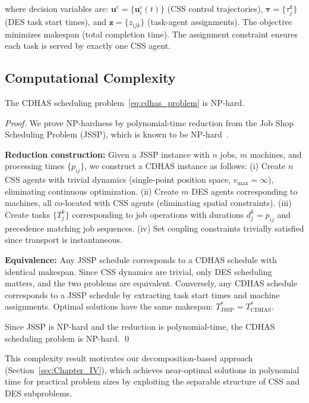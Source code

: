 \documentclass[manuscript,screen,review]{acmart}
\begin{document}
where decision variables are: $\mathbf{u}^c = \{\mathbf{u}_i^c(t)\}$ (CSS control 
trajectories), $\boldsymbol{\tau} = \{\tau_j^k\}$ (DES task start times), and 
$\mathbf{z} = \{z_{ijk}\}$ (task-agent assignments). The objective minimizes 
makespan (total completion time). The assignment constraint ensures each task 
is served by exactly one CSS agent.

\subsection{Computational Complexity}

\begin{proposition}
The CDHAS scheduling problem~\eqref{eq:cdhas_problem} is NP-hard.
\label{prop:np_hard}
\end{proposition}

\begin{proof}
We prove NP-hardness by polynomial-time reduction from the Job Shop Scheduling 
Problem (JSSP), which is known to be NP-hard~\cite{zheng2024continuous}.

\textbf{Reduction construction:} Given a JSSP instance with $n$ jobs, $m$ 
machines, and processing times $\{p_{ij}\}$, we construct a CDHAS instance 
as follows: (i) Create $n$ CSS agents with trivial dynamics (single-point 
position space, $v_{\max} = \infty$), eliminating continuous optimization. 
(ii) Create $m$ DES agents corresponding to machines, all co-located with 
CSS agents (eliminating spatial constraints). (iii) Create tasks $\{T_j^k\}$ 
corresponding to job operations with durations $d_j^k = p_{ij}$ and precedence 
matching job sequences. (iv) Set coupling constraints trivially satisfied 
since transport is instantaneous.

\textbf{Equivalence:} Any JSSP schedule corresponds to a CDHAS schedule with 
identical makespan. Since CSS dynamics are trivial, only DES scheduling matters, 
and the two problems are equivalent. Conversely, any CDHAS schedule corresponds 
to a JSSP schedule by extracting task start times and machine assignments. 
Optimal solutions have the same makespan: $T_{\text{JSSP}}^* = T_{\text{CDHAS}}^*$.

Since JSSP is NP-hard and the reduction is polynomial-time, the CDHAS scheduling 
problem is NP-hard. \qed
\end{proof}

This complexity result motivates our decomposition-based approach 
(Section~\ref{sec:Chapter_IV}), which achieves near-optimal solutions in 
polynomial time for practical problem sizes by exploiting the separable 
structure of CSS and DES subproblems.
\end{document}
